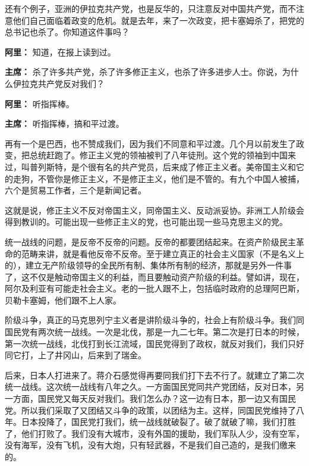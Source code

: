 \begin{duihua}
还有个例子，亚洲的伊拉克共产党，也是反华的，只注意反对中国共产党，而不注意他们自己面临着政变的危机。就是去年，来了一次政变，把卡塞姆杀了，把党的总书记也杀了。你知道这件事吗？

\item[\textbf{阿里：}] 知道，在报上读到过。

\item[\textbf{主席：}] 杀了许多共产党，杀了许多修正主义，也杀了许多进步人士。你说，为什么伊拉克共产党反对我们？

\item[\textbf{阿里：}] 听指挥棒。

\item[\textbf{主席：}] 听指挥棒，搞和平过渡。

再有一个是巴西，也不赞成我们，因为我们不同意和平过渡。几个月以前发生了政变，把总统赶跑了。修正主义党的领袖被判了八年徒刑。这个党的领袖到中国来过，叫普列斯特，是个很有名的共产党员，后来成了修正主义者。美帝国主义和它的走狗，不管你是修正主义，不是修正主义，他们是不管的。有九个中国人被捕，六个是贸易工作者，三个是新闻记者。

这就是说，修正主义不反对帝国主义，同帝国主义、反动派妥协。非洲工人阶级会得到教训的。可能出现一些修正主义的党，也可能出现一些马克思主义的党。

统一战线的问题，是反帝不反帝的问题。反帝的都要团结起来。在资产阶级民主革命的范畴来讲，就是看他反帝不反帝。至于建立真正的社会主义国家（不是名义上的），建立无产阶级领导的全民所有制、集体所有制的经济，那就是另外一件事了，这不仅是触动帝国主义的利益，而且要触动资产阶级的利益。譬如讲，现在，阿尔及利亚有可能走社会主义。老的一批人跟不上，包括临时政府的总理阿巴斯，贝勒卡塞姆，他们跟不上人家。

阶级斗争，真正的马克思列宁主义者是讲阶级斗争的，社会上有阶级斗争。我们同国民党有两次统一战线。一次是北伐，那是一九二七年。第二次是打日本的时候，第一次统一战线，北伐打到长江流域，国民党得到了政权，就反对我们，我们只好同它打，上了井冈山，后来到了瑞金。

后来，日本人打进来了。蒋介石感觉得再要同我们打下去不行了。就建立了第二次统一战线。这次统一战线有八年之久。一方面国民党同共产党团结，反对日本，另一方面，国民党又每天反对我们。我们怎么办？这一边有日本，那一边又有国民党。所以我们采取了又团结又斗争的政策，以团结为主。这样，同国民党维持了八年。日本投降了，国民党打我们，统一战线就破裂了。破了就破了嘛，我们打胜了，他们打败了。我们没有大城市，没有外国的援助，我们军队人少，没有空军，没有海军，没有飞机，没有大炮，只有轻武器，不是我们自己造的，是我们缴来的。


\end{duihua}
